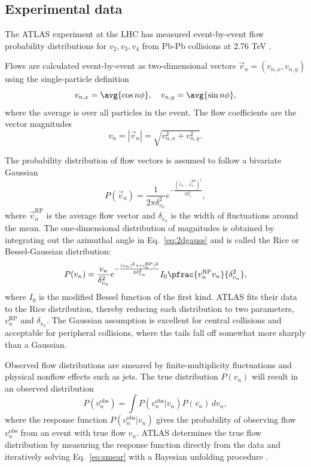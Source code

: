 \documentclass[reprint,amsmath]{revtex4-1}
\begin{document}
\subsection{Experimental data}

\def\obs{^\text{obs}}

The ATLAS experiment at the LHC has measured event-by-event flow probability distributions for $v_2,v_3,v_4$ from Pb-Pb collisions at 2.76
TeV \cite{atlas-vn,atlas-vn2}.

Flows are calculated event-by-event as two-dimensional vectors $\vec v_n = (v_{n,x},v_{n,y})$ using the single-particle definition
\begin{equation}
  v_{n,x} = \avg{\cos n\phi}, \quad
  v_{n,y} = \avg{\sin n\phi},
\end{equation}
where the average is over all particles in the event.  The flow coefficients are the vector magnitudes
\begin{equation}
  v_n = |\vec v_n| = \sqrt{v_{n,x}^2 + v_{n,y}^2}.
\end{equation}

The probability distribution of flow vectors is assumed to follow a bivariate Gaussian
\begin{equation}
  P(\vec v_n) = \frac{1}{2\pi\delta_{v_n}^2} e^{ -\frac{(\vec v_n - \vec v_n^\text{RP})^2}{2\delta_{v_n}^2} },
  \label{eq:2dgauss}
\end{equation}
where $\vec v_n^\text{RP}$ is the average flow vector and $\delta_{v_n}$ is the width of fluctuations around the mean.  
The one-dimensional distribution of magnitudes is obtained by integrating out the azimuthal angle in Eq.\ \eqref{eq:2dgauss} and is called
the Rice or Bessel-Gaussian distribution:
\begin{equation}
  P(v_n) = \frac{v_n}{\delta_{v_n}^2} e^{ -\frac{(v_n)^2 + (v_n^\text{RP})^2}{2\delta_{v_n}^2} }
    I_0 \pfrac{v_n^\text{RP}v_n}{\delta_{v_n}^2},
  \label{eq:rice}
\end{equation}
where $I_0$ is the modified Bessel function of the first kind.  ATLAS fits their data to the Rice distribution, thereby reducing each
distribution to two parameters, $v_n^\text{RP}$ and $\delta_{v_n}$.  The Gaussian assumption is excellent for central collisions and
acceptable for peripheral collisions, where the tails fall off somewhat more sharply than a Gaussian.

Observed flow distributions are smeared by finite-multiplicity fluctuations and physical nonflow effects such as jets.  The true
distribution $P(v_n)$ will result in an observed distribution \cite{phobos}
\begin{equation}
  P(v_n\obs) = \int P(v_n\obs|v_n) P(v_n) \, dv_n,
  \label{eq:smear}
\end{equation}
where the response function $P(v_n^\text{obs}|v_n)$ gives the probability of observing flow $v_n^\text{obs}$ from an event with true flow
$v_n$.  ATLAS determines the true flow distribution by measuring the response function directly from the data and iteratively solving Eq.\
\eqref{eq:smear} with a Bayesian unfolding procedure \cite{unfolding}.
\end{document}
